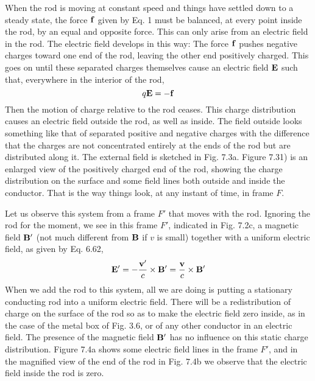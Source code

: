 When the rod is moving at constant speed and things have settled
down to a steady state, the force $\mathbf{f}$ given by Eq. 1 must be balanced,
at every point inside the rod, by an equal and opposite force. This
can only arise from an electric field in the rod. The electric field
develops in this way: The force $\mathbf{f}$ pushes negative charges toward one
end of the rod, leaving the other end positively charged. This goes
on until these separated charges themselves cause an electric field $\mathbf{E}$
such that, everywhere in the interior of the rod,
\begin{equation}
  q\mathbf{E} = -\mathbf{f}
\end{equation}
Then the motion of charge relative to the rod ceases. This charge
distribution causes an electric field outside the rod, as well as inside.
The field outside looks something like that of separated positive and
negative charges with the difference that the charges are not concentrated
entirely at the ends of the rod but are distributed along it. The
external field is sketched in Fig. 7.3a. Figure 7.31) is an enlarged view
of the positively charged end of the rod, showing the charge distribution
on the surface and some field lines both outside and inside the
conductor. That is the way things look, at any instant of time, in
frame $F$.

Let us observe this system from a frame $F'$ that moves with the rod.
Ignoring the rod for the moment, we see in this frame $F'$, indicated in
Fig. 7.2c, a magnetic field $\mathbf{B}'$ (not much different from $\mathbf{B}$ if $v$ is small)
together with a uniform electric field, as given by Eq. 6.62,
\begin{equation}
  \mathbf{E}' = -\frac{\mathbf{v}'}{c}\times\mathbf{B}' = \frac{\mathbf{v}}{c}\times\mathbf{B}'
\end{equation}
When we add the rod to this system, all we are doing is putting a
stationary conducting rod into a uniform electric field. There will
be a redistribution of charge on the surface of the rod so as to make
the electric field zero inside, as in the case of the metal box of Fig. 3.6,
or of any other conductor in an electric field. The presence of the
magnetic field $\mathbf{B}'$ has no influence on this static charge distribution.
Figure 7.4a shows some electric field lines in the frame $F'$, and in the
magnified view of the end of the rod in Fig. 7.4b we observe that the
electric field inside the rod is zero.

